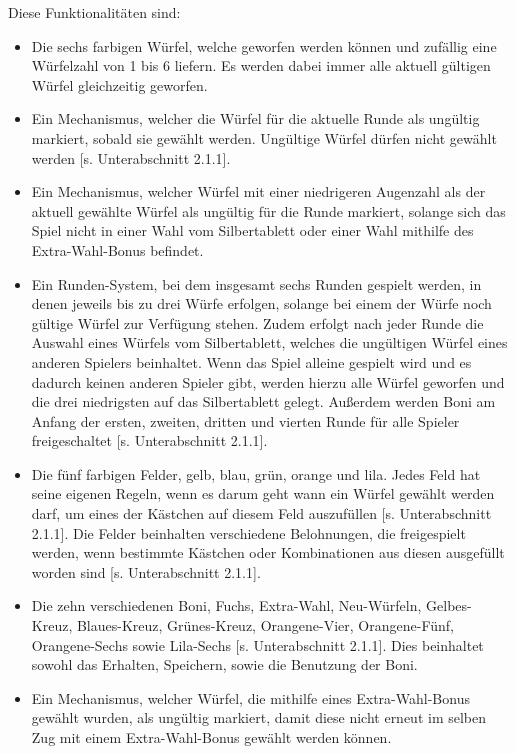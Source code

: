 Diese Funktionalitäten sind:
\begin{itemize}
\item Die sechs farbigen Würfel, welche geworfen werden können und zufällig eine Würfelzahl von 1 bis 6 liefern. Es werden dabei immer alle aktuell gültigen Würfel gleichzeitig geworfen.

\item Ein Mechanismus, welcher die Würfel für die aktuelle Runde als ungültig markiert, sobald sie gewählt werden. Ungültige Würfel dürfen nicht gewählt werden [s. Unterabschnitt 2.1.1].

\item Ein Mechanismus, welcher Würfel mit einer niedrigeren Augenzahl als der aktuell gewählte Würfel als ungültig für die Runde markiert, solange sich das Spiel nicht in einer Wahl vom Silbertablett oder einer Wahl mithilfe des Extra-Wahl-Bonus befindet.

\item Ein Runden-System, bei dem insgesamt sechs Runden gespielt werden, in denen jeweils bis zu drei Würfe erfolgen, solange bei einem der Würfe noch gültige Würfel zur Verfügung stehen. Zudem erfolgt nach jeder Runde die Auswahl eines Würfels vom Silbertablett, welches die ungültigen Würfel eines anderen Spielers beinhaltet. Wenn das Spiel alleine gespielt wird und es dadurch keinen anderen Spieler gibt, werden hierzu alle Würfel geworfen und die drei niedrigsten auf das Silbertablett gelegt. Außerdem werden Boni am Anfang der ersten, zweiten, dritten und vierten Runde für alle Spieler freigeschaltet [s. Unterabschnitt 2.1.1].

\item Die fünf farbigen Felder, gelb, blau, grün, orange und lila. Jedes Feld hat seine eigenen Regeln, wenn es darum geht wann ein Würfel gewählt werden darf, um eines der Kästchen auf diesem Feld auszufüllen [s. Unterabschnitt 2.1.1]. Die Felder beinhalten verschiedene Belohnungen, die freigespielt werden, wenn bestimmte Kästchen oder Kombinationen aus diesen ausgefüllt worden sind [s. Unterabschnitt 2.1.1].

\item Die zehn verschiedenen Boni, Fuchs, Extra-Wahl, Neu-Würfeln, Gelbes-Kreuz, Blaues-Kreuz, Grünes-Kreuz, Orangene-Vier, Orangene-Fünf, Orangene-Sechs sowie Lila-Sechs [s. Unterabschnitt 2.1.1]. Dies beinhaltet sowohl das Erhalten, Speichern, sowie die Benutzung der Boni.

\item Ein Mechanismus, welcher Würfel, die mithilfe eines Extra-Wahl-Bonus gewählt wurden, als ungültig markiert, damit diese nicht erneut im selben Zug mit einem Extra-Wahl-Bonus gewählt werden können.


\end{itemize}

